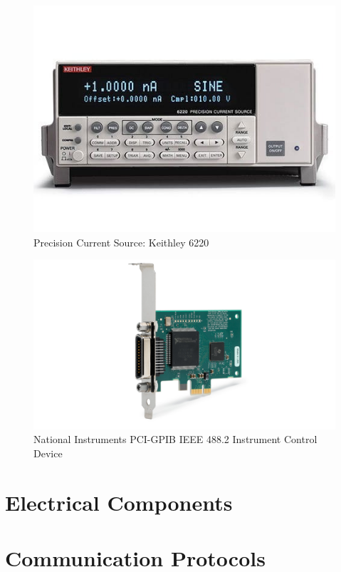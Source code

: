 \documentclass[12pt, titlepage]{article}
\begin{document}
\begin{figure}[H]
\centerline{\includegraphics[scale=0.5]{3.jpg}}
\caption{Precision Current Source: Keithley 6220}
\label{fig}
\end{figure}

\begin{figure}[H]
\centerline{\includegraphics[scale=0.25]{4.png}}
\caption{National Instruments PCI-GPIB IEEE 488.2 Instrument Control Device}
\label{fig}
\end{figure}

\section{Electrical Components}

\section{Communication Protocols}
\end{document}
